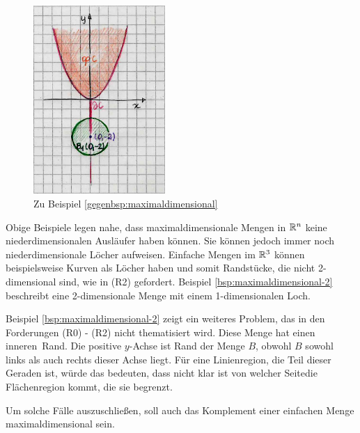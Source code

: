     
    \begin{figure}[ht]
        \centering
        \includegraphics[width=5cm]{abb/nicht-maxdim.png}
        \caption{Zu Beispiel \ref{gegenbsp:maximaldimensional}}
        \label{fig:nicht-maxdim}
    \end{figure}

    Obige
    Beispiele legen nahe, dass maximaldimensionale Mengen in $\mathbb{R}^n$ keine niederdimensionalen Ausläufer haben können.
    Sie können jedoch immer noch niederdimensionale Löcher aufweisen.
    Einfache Mengen im $\mathbb{R}^3$ können beispielsweise Kurven als Löcher haben und somit Randstücke, die nicht 2-dimensional sind, wie in (R2) gefordert. 
    Beispiel \ref{bsp:maximaldimensional-2} beschreibt eine 2-dimensionale Menge mit einem 1-dimensionalen Loch.
    
    Beispiel \ref{bsp:maximaldimensional-2} zeigt ein weiteres Problem, das in den Forderungen (R0) - (R2) nicht thematisiert wird. Diese Menge hat einen \glqq inneren\grqq\ Rand. Die positive $y$-Achse ist Rand der Menge $B$, obwohl $B$ sowohl links als auch rechts dieser Achse liegt. Für eine Linienregion, die Teil dieser Geraden ist, würde das bedeuten, dass nicht klar ist \glqq von welcher Seite\grqq die Flächenregion kommt, die sie begrenzt.
    
    Um
    solche Fälle auszuschließen, soll auch das Komplement einer einfachen Menge maximaldimensional sein.

